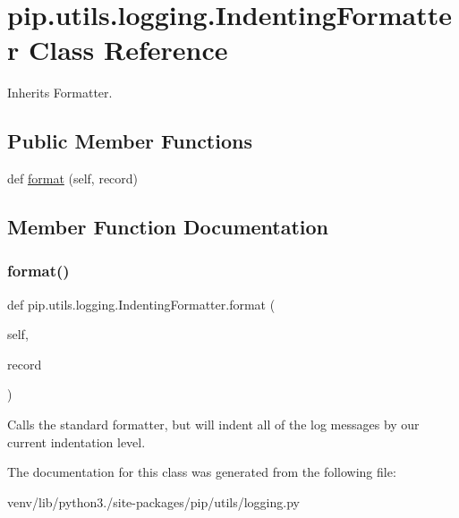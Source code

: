 \hypertarget{classpip_1_1utils_1_1logging_1_1_indenting_formatter}{}\section{pip.\+utils.\+logging.\+Indenting\+Formatter Class Reference}
\label{classpip_1_1utils_1_1logging_1_1_indenting_formatter}


Inherits Formatter.

\subsection*{Public Member Functions}
\begin{DoxyCompactItemize}
\item 
def \hyperlink{classpip_1_1utils_1_1logging_1_1_indenting_formatter_a0ea933d07bef9276deedaa8044b8abf3}{format} (self, record)
\end{DoxyCompactItemize}


\subsection{Member Function Documentation}
\mbox{\label{classpip_1_1utils_1_1logging_1_1_indenting_formatter_a0ea933d07bef9276deedaa8044b8abf3}} 
\subsubsection{\texorpdfstring{format()}{format()}}
{\footnotesize\ttfamily def pip.\+utils.\+logging.\+Indenting\+Formatter.\+format (\begin{DoxyParamCaption}\item[{}]{self,  }\item[{}]{record }\end{DoxyParamCaption})}

\begin{DoxyVerb}Calls the standard formatter, but will indent all of the log messages
by our current indentation level.
\end{DoxyVerb}
 

The documentation for this class was generated from the following file\+:\begin{DoxyCompactItemize}
\item 
venv/lib/python3./site-\/packages/pip/utils/logging.\+py\end{DoxyCompactItemize}
